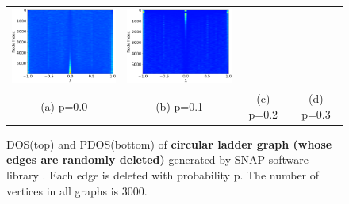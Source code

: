 \documentclass[senior,final,11pt]{iscs-thesis}
\begin{document}
\begin{figure}[htbp]
\begin{tabular}{cccc}
    \includegraphics[width=45mm]{figure/circular_ladder_graph_deleted_n3000_pdel02txt_pdos.png} &
    \includegraphics[width=45mm]{figure/circular_ladder_graph_deleted_n3000_pdel03txt_pdos.png} \\
    (a) p=0.0 & (b) p=0.1 & (c) p=0.2 & (d) p=0.3\\ [6pt]
  \end{tabular}
  \caption{DOS(top) and PDOS(bottom) of {\bf circular ladder graph (whose edges are randomly deleted)} generated by SNAP software library \cite{leskovec2016snap}. Each edge is deleted with probability p. The number of vertices in all graphs is 3000.}
  \label{fig:circular_ladder}
\end{figure}
\end{document}
